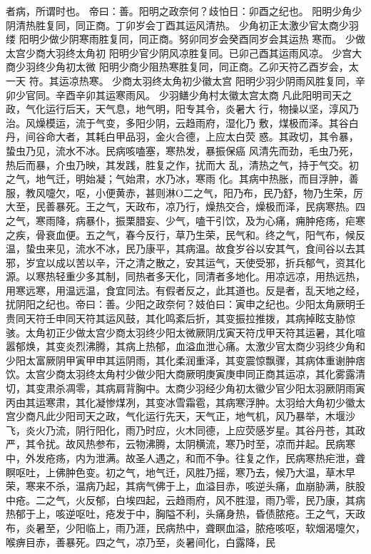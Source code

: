 \documentclass[a4paper,12pt,UTF8,twoside]{ctexbook}
\begin{document}
者病，所谓时也。
帝曰：善。阳明之政奈何？歧怕日：卯酉之纪也。
阳明少角少阴清热胜复同，同正商。丁卯岁会丁酉其运风清热。
少角初正太激少官太商少羽缕
阳明少做少阴寒雨胜复同，同正商。努卯同岁会癸酉同岁会其运热
寒而。
少做太宫少商大羽终太角初
阳明少官少阴风凉胜复同。已卯己酉其运雨风凉。
少宫大商少羽终少角初太微
阳明少商少阻热寒胜复同，同正商。乙卯天符乙酉岁会，太一天
符。其运凉热寒。
少商太羽终太角初少徽太宫
阳明少羽少阴雨风胜复同，辛卯少官同。辛酉辛卯其运寒雨风。
少羽鳝少角村太徽太宫太商
凡此阳明司天之政，气化运行后天，天气息，地气明，阳专其令，炎暑大
行，物操以坚，淳风乃治。风燥模运，流于气变，多阳少阴，云趋雨府，湿化乃
敷，煤极而泽。其谷白丹，间谷命大者，其耗白甲品羽，金火合德，上应太白荧
惑。其政切，其令暴，蛰虫乃见，流水不冰。民病咳嗑塞，寒热发，暴振保癌
风清先而劲，毛虫乃死，热后而暴，介虫乃映，其发践，胜复之作，扰而大
乱，清热之气，持于气交。初之气，地气迁，明始凝；气始肃，水乃冰，寒雨
化。其病中热胀，而目浮肿，善服，教风嚏欠，呕，小便黄赤，甚则淋O二之气，阳乃布，民乃舒，物乃生荣，厉大至，民善暴死。王之气，天政布，凉乃行，燥热交合，燥极而泽，民病寒热。四之气，寒雨降，病暴仆，振栗腊妄、少气，嗑干引饮，及为心痛，痈肿疮疡，疟寒之疾，骨衰血便。五之气，春今反行，草乃生荣，民气和。终之气，阳气布，候反温，蛰虫来见，流水不冰，民乃康平，其病温。故食岁谷以安其气，食间谷以去其邪，岁宜以成以苦以辛，汗之清之散之，安其运气，天使受邪，折兵郁气，资其化源。以寒热轻重少多其制，同热者多天化，同清者多地化。用凉远凉，用热远热，用寒远寒，用温远温，食宜同法。有假者反之，此其道也。反是者，乱天地之经，扰阴阳之纪也。帝曰：善。少阳之政奈何？妓伯曰：寅申之纪也。少阳太角厥明壬贵同天符壬申同天符其运风鼓，其化鸣紊后折，其变振拉推拨，其病掉眩支胁惊骇。太角初正少做太宫少商太羽终少阳太微厥阴戊寅天符戊甲天符其运暑，其化喧嚣郁焕，其变炎烈沸腾，其病上热郁，血溢血泄心痛。太激少官太商少羽终少角和少阳太富厥阴甲寅甲申其运阴雨，其化柔润重泽，其变震惊飘骤，其病体重谢肿痞饮。太宫少商太羽终太角村少做少阳大商厥明庚寅庚申同正商其运凉，其化雾露清切，其变肃杀凋零，其病肩背胸中。太商少羽经少角初太徽少官少阳太羽厥阴雨寅丙由其运寒肃，其化凝惨煤冽，其变冰雪霜雹，其病寒浮肿。太羽给大角初少徽太宫少商凡此少阳司天之政，气化运行先天，天气正，地气机，风乃暴举，木堰沙飞，炎火乃流，阴行阳化，雨乃时应，火木同德，上应荧感岁星。其谷丹苍，其政严，其令扰。故风热参布，云物沸腾，太阴横流，寒乃时至，凉而并起。民病寒中，外发疮疡，内为泄满。故圣人遇之，和而不争。往复之作，民病寒热疟泄，聋瞑呕吐，上佛肿色变。初之气，地气迁，风胜乃摇，寒乃去，候乃大温，草木早荣，寒来不杀，温病乃起，其病气佛于上，血溢目赤，咳逆头痛，血崩胁满，肤股中疮。二之气，火反郁，白埃四起，云趋雨府，风不胜湿，雨乃零，民乃康，其病热郁于上，咳逆呕吐，疮发于中，胸隘不利，头痛身热，昏债脓疮。王之气，天政布，炎暑至，少阳临上，雨乃涯，民病热中，聋瞑血溢，脓疮咳呕，软烟渴嚏欠，喉痹目赤，善暴死。四之气，凉乃至，炎暑间化，白露降，民
\end{document}
